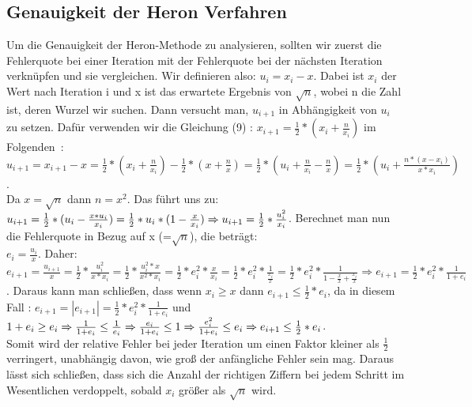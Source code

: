 \documentclass[course=erap]{aspdoc}
\begin{document}
\subsection{Genauigkeit der Heron Verfahren}
Um die Genauigkeit der Heron-Methode zu analysieren, sollten wir zuerst die Fehlerquote bei einer Iteration mit der Fehlerquote bei der nächsten Iteration verknüpfen und sie vergleichen. Wir definieren also: $u_{i} = x_{i} - x$.
Dabei ist $x_{i}$ der Wert nach Iteration i und x ist das erwartete Ergebnis von $\sqrt{n}$, wobei n die Zahl ist, deren Wurzel wir suchen. Dann versucht man, $u_{i+1}$ in Abhängigkeit von $u_{i}$ zu setzen. Dafür verwenden wir die Gleichung (9) : $x_{i+1} = \frac{1}{2}*(x_{i}+\frac{n}{x_{i}})$ im Folgenden~\cite{HeronsGenauigkeit}:\\
$ u_{i+1} = x_{i+1} - x = \frac{1}{2}*(x_{i}+\frac{n}{x_{i}}) -  \frac{1}{2}*(x +\frac{n}{x})= \frac{1}{2}*(u_{i}+\frac{n}{x_{i}}-\frac{n}{x})=
    \frac{1}{2}*(u_{i}+\frac{n*(x-x_{i})}{x*x_{i}})$.\\
Da $x = \sqrt{n}$ dann $n = x^{2}$. Das führt uns zu:
$u_{i+1} = \frac{1}{2}*(u_{i}-\frac{x*u_{i}}{x_{i}}) = \frac{1}{2}*u_{i}*(1-\frac{x}{x_{i}}) \Rightarrow \\
    u_{i+1} = \frac{1}{2}*\frac{u_{i}^{2}}{x_{i}}$.
Berechnet man nun die Fehlerquote in Bezug auf x (=$\sqrt{n}$), die beträgt: \\
$e_{i} = \frac{u_{i}}{x} $. Daher: $e_{i+1} = \frac{u_{i+1}}{x} = \frac{1}{2}*\frac{u_{i}^{2}}{x*x_{i}} = \frac{1}{2}*\frac{u_{i}^{2}*x}{x^{2}*x_{i}} =
    \frac{1}{2}*e_{i}^{2}*\frac{x}{x_{i}} =
    \frac{1}{2}*e_{i}^{2}*\frac{1}{\frac{x_i}{x}} =
    \frac{1}{2}*e_{i}^{2}*\frac{1}{1-\frac{x}{x}+\frac{x_i}{x}}\Rightarrow e_{i+1} = \frac{1}{2}*e_{i}^{2}*\frac{1}{1+e_{i}}$.
Daraus kann man schließen, dass wenn $x_{i} \geq x $ dann $e_{i+1} \leq \frac{1}{2}*e_{i}$, da in diesem Fall : $e_{i+1} = |e_{i+1}| = \frac{1}{2}*e_{i}^{2}*\frac{1}{1+e_{i}}$ und $1+e_{i} \geq e_{i} \Rightarrow \\
    \frac{1}{1+e_{i}} \leq \frac{1}{e_{i}}
    \Rightarrow \frac{e_{i}}{1+e_{i}} \leq 1 \Rightarrow  \frac{e_{i}^{2}}{1+e_{i}} \leq e_{i} \Rightarrow e_{i+1}  \leq \frac{1}{2}*e_{i} $.  \\
Somit wird der relative Fehler bei jeder Iteration um einen Faktor kleiner als $\frac{1}{2}$ verringert, unabhängig davon, wie groß der anfängliche Fehler sein mag. Daraus lässt sich schließen, dass sich die Anzahl der richtigen Ziffern bei jedem Schritt im Wesentlichen verdoppelt, sobald $x_{i}$ größer als $\sqrt{n}$ wird.
\end{document}
